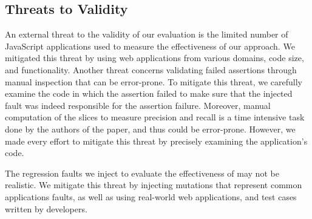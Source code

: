 \subsection{Threats to Validity} \label{Sec:threatsToValidity}
An external threat to the validity of our evaluation is the limited number of JavaScri\-pt applications used to measure the effectiveness of our approach. We mitigated this threat by using web applications from various domains, code size, and functionality. Another threat concerns validating failed assertions through manual inspection that can be error-prone. To mitigate this threat, we carefully examine the code in which the assertion failed to make sure that the injected fault was indeed responsible for the assertion failure. Moreover, manual computation of the \javascript slices to measure precision and recall is a time intensive task done by the authors of the paper, and thus could be error-prone. However, we made every effort to mitigate this threat by precisely examining the application's code.

The regression faults we inject to evaluate the effectiveness of \atrina may not be realistic. We mitigate this threat by injecting mutations that represent common \javascript applications faults, as well as using real-world web applications, and \selenium test cases written by developers.